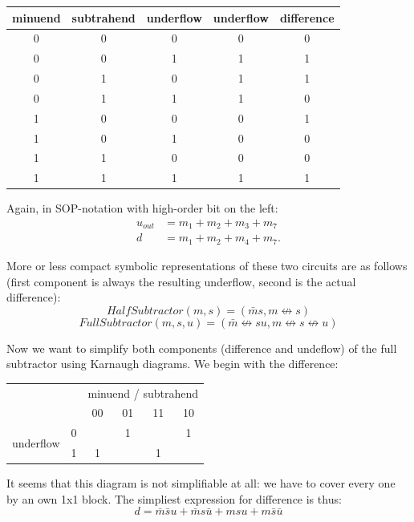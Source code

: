 \documentclass[10pt,a4paper]{scrartcl}
\newcommand{\subExercise}[1]{\vspace{0.5em} \noindent{\bf #1)}}
\begin{document}
\vspace{0.5em}
\begin{tabular}{|c c c|c c|}
  \hline
  minuend & subtrahend & underflow & underflow & difference \\
  \hline
  0 & 0 & 0 & 0 & 0 \\
  0 & 0 & 1 & 1 & 1 \\ 
  0 & 1 & 0 & 1 & 1 \\ 
  0 & 1 & 1 & 1 & 0 \\ 
  1 & 0 & 0 & 0 & 1 \\ 
  1 & 0 & 1 & 0 & 0 \\ 
  1 & 1 & 0 & 0 & 0 \\ 
  1 & 1 & 1 & 1 & 1 \\ 
  \hline
\end{tabular}

Again, in SOP-notation with high-order bit on the left:
\begin{align*}
  u_{out} &= m_1 + m_2 + m_3 + m_7 \\
  d &= m_1 + m_2 + m_4 + m_7.
\end{align*}

\subExercise{b} 
More or less compact symbolic representations 
of these two circuits are as follows 
(first component is always the resulting underflow, 
 second is the actual difference):
\[
  HalfSubtractor(m,s) = (\bar m s, m \not\leftrightarrow s)
\]
\[
  FullSubtractor(m,s,u) = 
    (\bar m \not\leftrightarrow su, 
     m \not\leftrightarrow s \not\leftrightarrow u
    )
\]

\subExercise{c} 
Now we want to simplify both components (difference and undeflow) 
of the full subtractor using Karnaugh diagrams. We begin with the
difference:

\vspace{0.5em}
\begin{tabular}{|c c|c c c c|}
  \hline 
    & & \multicolumn{4}{c|}{minuend / subtrahend} \\
    & & 00 & 01 & 11 & 10 \\
  \hline
    \multirow{2}{*}{underflow} & 0 &   & \cellcolor{blue}1 &   & \cellcolor{orange}1 \\
                               & 1 & \cellcolor{red}1 &   & \cellcolor{green}1 &   \\
  \hline
\end{tabular}

It seems that this diagram is not simplifiable at all: we have to cover every
one by an own 1x1 block. The simpliest expression for difference is thus:
\[
  d = \bar m \bar s u + \bar m s \bar u + m s u + m \bar s \bar u
\]
\end{document}
